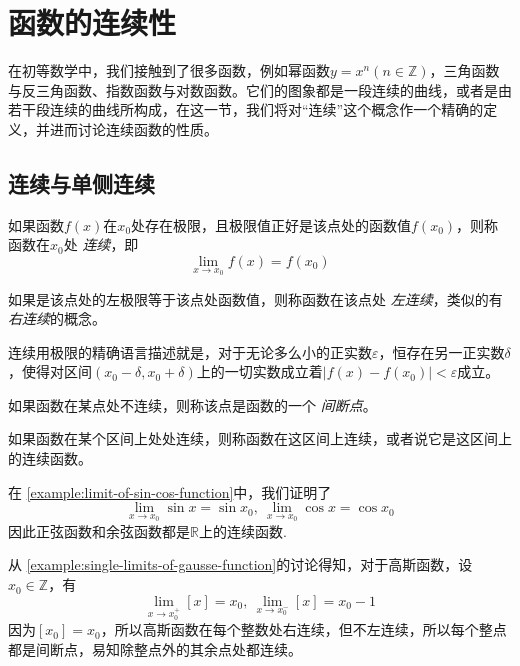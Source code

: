 
\section{函数的连续性}
\label{sec:continuousness-of-function}

在初等数学中，我们接触到了很多函数，例如幂函数$y=x^n(n \in \mathbb{Z})$，三角函数与反三角函数、指数函数与对数函数。它们的图象都是一段连续的曲线，或者是由若干段连续的曲线所构成，在这一节，我们将对“连续”这个概念作一个精确的定义，并进而讨论连续函数的性质。

\subsection{连续与单侧连续}
\label{sec:continuousness-and-single-continuousness}

\begin{definition}
  如果函数$f(x)$在$x_0$处存在极限，且极限值正好是该点处的函数值$f(x_0)$，则称函数在$x_0$处 \emph{连续}，即
  \[ \lim_{x \to x_0} f(x) = f(x_0) \]
\end{definition}

如果是该点处的左极限等于该点处函数值，则称函数在该点处 \emph{左连续}，类似的有 \emph{右连续}的概念。

连续用极限的精确语言描述就是，对于无论多么小的正实数$\varepsilon$，恒存在另一正实数$\delta$，使得对区间$(x_0-\delta, x_0+\delta)$上的一切实数成立着$|f(x)-f(x_0)|<\varepsilon$成立。

如果函数在某点处不连续，则称该点是函数的一个 \emph{间断点}。

\begin{definition}
  如果函数在某个区间上处处连续，则称函数在这区间上连续，或者说它是这区间上的连续函数。
\end{definition}

\begin{example}
  在 \autoref{example:limit-of-sin-cos-function}中，我们证明了
  \[ \lim_{x \to x_0} \sin{x} = \sin{x_0}, \  \lim_{x \to x_0} \cos{x} = \cos{x_0} \]
  因此正弦函数和余弦函数都是$\mathbb{R}$上的连续函数.
\end{example}

\begin{example}
  从 \autoref{example:single-limits-of-gausse-function}的讨论得知，对于高斯函数，设$x_0 \in \mathbb{Z}$，有
    \[ \lim_{x \to x_0^+} [x] = x_0, \  \lim_{x \to x_0^-} [x] = x_0-1 \]
    因为$[x_0]=x_0$，所以高斯函数在每个整数处右连续，但不左连续，所以每个整点都是间断点，易知除整点外的其余点处都连续。
\end{example}


